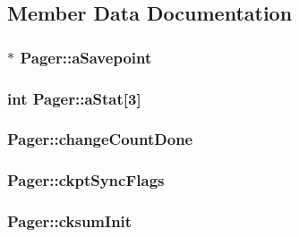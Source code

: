 \subsection{Member Data Documentation}
\hypertarget{struct_pager_a4d5f4487316c026eceb8461e90fffcfd}{
\subsubsection[{a\-Savepoint}]{$\ast$ Pager\-::a\-Savepoint}}\label{struct_pager_a4d5f4487316c026eceb8461e90fffcfd}
\hypertarget{struct_pager_a0b3bb8afc7c4c82e0e99f3ad99dd0986}{
\subsubsection[{a\-Stat}]{\setlength{\rightskip}{0pt plus 5cm}int Pager\-::a\-Stat\mbox{[}3\mbox{]}}}\label{struct_pager_a0b3bb8afc7c4c82e0e99f3ad99dd0986}
\hypertarget{struct_pager_a90c86a51ec6805d5702d32e456b0bcdc}{
\subsubsection[{change\-Count\-Done}]{ Pager\-::change\-Count\-Done}}\label{struct_pager_a90c86a51ec6805d5702d32e456b0bcdc}
\hypertarget{struct_pager_a4543ec92953e7bda49b3ed4f0bdab890}{
\subsubsection[{ckpt\-Sync\-Flags}]{ Pager\-::ckpt\-Sync\-Flags}}\label{struct_pager_a4543ec92953e7bda49b3ed4f0bdab890}
\hypertarget{struct_pager_ad799667658328a44b471378a1b99623e}{
\subsubsection[{cksum\-Init}]{ Pager\-::cksum\-Init}}\label{struct_pager_ad799667658328a44b471378a1b99623e}
